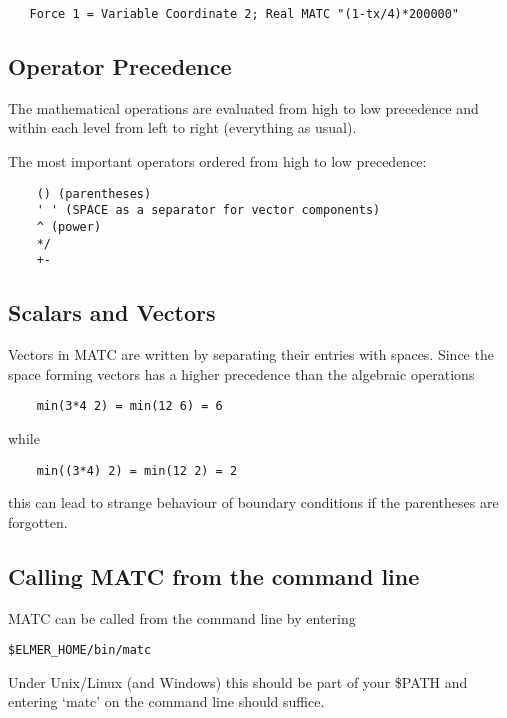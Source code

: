 \begin{verbatim}
   Force 1 = Variable Coordinate 2; Real MATC "(1-tx/4)*200000"
\end{verbatim}

\subsection{Operator Precedence}

The mathematical operations are evaluated from high to low precedence and within each level from left to right (everything as usual).

\noindent The most important operators ordered from high to low precedence:

\begin{verbatim}
    () (parentheses)
    ' ' (SPACE as a separator for vector components)
    ^ (power)
    */
    +-
\end{verbatim}

\subsection{Scalars and Vectors}

Vectors in MATC are written by separating their entries with spaces. Since the space forming vectors has a higher precedence than the algebraic operations

\begin{verbatim}
    min(3*4 2) = min(12 6) = 6
\end{verbatim}

\noindent while

\begin{verbatim}
    min((3*4) 2) = min(12 2) = 2
\end{verbatim}

\noindent this can lead to strange behaviour of boundary conditions if the parentheses are forgotten. 

\subsection{Calling MATC from the command line}

MATC can be called from the command line by entering \begin{verbatim}$ELMER_HOME/bin/matc\end{verbatim} Under Unix/Linux (and Windows) this should be part of your \$PATH and entering `matc' on the command line should suffice.\\

